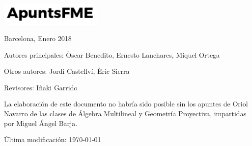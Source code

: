 \begin{titlepage}
    \vspace{1\baselineskip} %


    \vspace{2\baselineskip} %


    \vfill %


    \includegraphics[width=5cm]{../logo.pdf}

    \vspace{0.3\baselineskip} %
     
    Barcelona, Enero 2018



\end{titlepage}

\vspace*{\fill}

\noindent Autores principales: Òscar Benedito, Ernesto Lanchares, Miquel Ortega

\quad

\noindent Otros autores: Jordi Castellví, Èric Sierra

\quad

\noindent Revisores: Iñaki Garrido

\quad

\noindent La elaboración de este documento no habría sido posible sin los apuntes de Oriol Navarro de las clases de Álgebra Multilineal y Geometría Proyectiva, impartidas por Miguel Ángel Barja.

\quad

\noindent Última modificación: \today
\doclicenseThis
